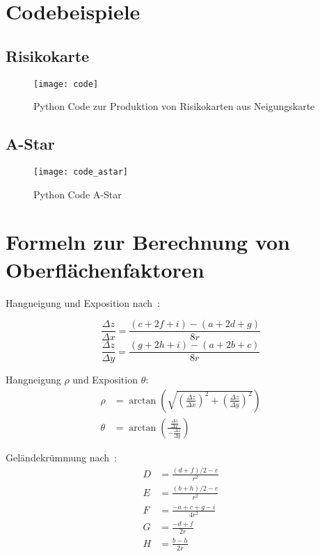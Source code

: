 
\section{Codebeispiele}
\subsection{Risikokarte}
\begin{figure}[H]
  \centering
  \texttt{[image: code]}
  \caption{Python Code zur Produktion von Risikokarten aus Neigungskarte}\label{fig:python}
\end{figure}
\subsection{A-Star}
\begin{figure}[H]
  \centering
  \texttt{[image: code\_astar]}
  \caption{Python Code A-Star}\label{fig:pythonastar}
\end{figure}



\pagebreak
\section{Formeln zur Berechnung von Oberflächenfaktoren}\label{app:formeln}
Hangneigung und Exposition nach~\cite{gisslopeaspect}:

\begin{equation} \label{eq1}
  \frac{\Delta z}{\Delta x} = \frac{(c + 2f + i) - (a + 2d + g)}{8r}
\end{equation}
\begin{equation} \label{eq2}
  \frac{\Delta z}{\Delta y} = \frac{(g + 2h + i) - (a + 2b + c)}{8r}
\end{equation}

Hangneigung $\rho$ und Exposition $\theta$:
\begin{align}
  \rho &= \arctan \left( \sqrt{
    {\left( \frac{\Delta z}{\Delta x}\right)}^2 + 
    {\left(\frac{\Delta z}{\Delta y}\right)}^2}
  \right)\\
  \theta &= \arctan\left(\frac{\frac{\Delta z}{\Delta x}}{-\frac{\Delta z}{\Delta y}}\right)
\end{align}

Geländekrümmung nach~\cite{gismath}:
\begin{align}
  D &= \frac{{(d + f) / 2 - e}}{{r^2}} \\
  E &= \frac{{(b + h) / 2 - e}}{{r^2}} \\
  F &= \frac{{-a + c + g - i}}{{4r^2}} \\
  G &= \frac{{-d + f}}{{2r}} \\
  H &= \frac{{b - h}}{{2r}}
\end{align}

